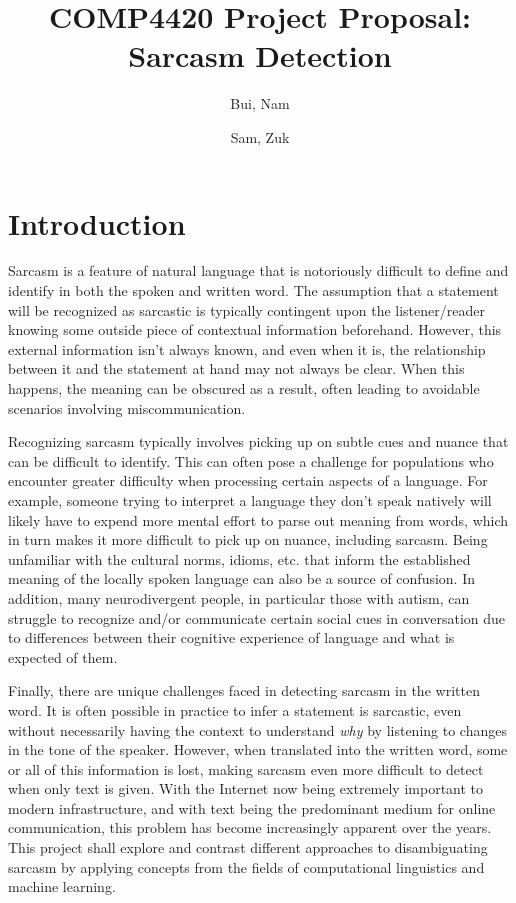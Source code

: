 \documentclass[11pt]{article}
\title{COMP4420 Project Proposal: Sarcasm Detection}
\author{
    Bui, Nam \\
    \email{nam\_bui@student.uml.edu}
    \and
    Sam, Zuk \\
    \email {samuel\_zuk@student.uml.edu}
}
\begin{document}
\maketitle

\section{Introduction}

\par{Sarcasm is a feature of natural language that is notoriously difficult to
define and identify in both the spoken and written word. The assumption that a
statement will be recognized as sarcastic is typically contingent upon the
listener/reader knowing some outside piece of contextual information
beforehand. However, this external information isn't always known, and even
when it is, the relationship between it and the statement at hand may not
always be clear. When this happens, the meaning can be obscured as a result,
often leading to avoidable scenarios involving miscommunication.}

\par{Recognizing sarcasm typically involves picking up on subtle cues and
nuance that can be difficult to identify. This can often pose a challenge for
populations who encounter greater difficulty when processing certain aspects of
a language. For example, someone trying to interpret a language they don't
speak natively will likely have to expend more mental effort to parse out
meaning from words, which in turn makes it more difficult to pick up on nuance,
including sarcasm. Being unfamiliar with the cultural norms, idioms, etc. that
inform the established meaning of the locally spoken language can also be a
source of confusion. In addition, many neurodivergent people, in particular
those with autism, can struggle to recognize and/or communicate certain social
cues in conversation due to differences between their cognitive experience of
language and what is expected of them.}

\par{Finally, there are unique challenges faced in detecting sarcasm in the
written word. It is often possible in practice to infer a statement is
sarcastic, even without necessarily having the context to understand
\textit{why} by listening to changes in the tone of the speaker. However, when
translated into the written word, some or all of this information is lost,
making sarcasm even more difficult to detect when only text is given. With the
Internet now being extremely important to modern infrastructure, and with text
being the predominant medium for online communication, this problem has become
increasingly apparent over the years. This project shall explore and contrast
different approaches to disambiguating sarcasm by applying concepts from the
fields of computational linguistics and machine learning.}
\end{document}
